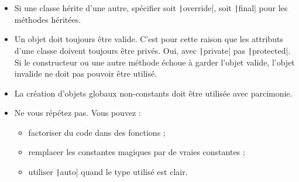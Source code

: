 \documentclass[12pt,a4paper]{article}
\begin{document}
\begin{itemize}
\begin{itemize}
	\end{itemize}
\item Si une classe hérite d'une autre, spécifier soit \texttt|override|, soit \texttt|final| pour les méthodes héritées.
\item Un objet doit toujours être valide. C'est pour cette raison que les attributs d'une classe doivent toujours être privés. Oui, avec \texttt|private| pas \texttt|protected|. Si le constructeur ou une autre méthode échoue à garder l'objet valide, l'objet invalide ne doit pas pouvoir être utilisé.
\item La création d'objets globaux non-constants doit être utilisée avec parcimonie.
\item Ne vous répétez pas. Vous pouvez :
	\begin{itemize}
	\item factoriser du code dans des fonctions ;
	\item remplacer les \og constantes magiques \fg{} par de vraies constantes ;
	\item utiliser \texttt|auto| quand le type utilisé est clair.
	\end{itemize}
\end{itemize}
\end{document}
